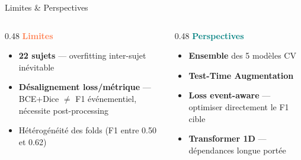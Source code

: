\documentclass[aspectratio=169, 10pt]{beamer}
\begin{document}
\begin{frame}{Limites \& Perspectives}
    \begin{columns}[T]
        \begin{column}{0.48\textwidth}
            \textbf{\textcolor{Coral}{Limites}}
            \begin{itemize}\setlength\itemsep{3pt}\small
                \item \textbf{22 sujets} --- overfitting inter-sujet inévitable
                \item \textbf{Désalignement loss/métrique} ---
                      BCE+Dice $\neq$ F1 événementiel,\\
                      nécessite post-processing
                \item Hétérogénéité des folds (F1 entre 0.50 et 0.62)
            \end{itemize}
        \end{column}
        \begin{column}{0.48\textwidth}
            \textbf{\textcolor{Teal}{Perspectives}}
            \begin{itemize}\setlength\itemsep{3pt}\small
                \item \textbf{Ensemble} des 5 modèles CV
                \item \textbf{Test-Time Augmentation}
                \item \textbf{Loss event-aware} ---
                      optimiser directement le F1 cible
                \item \textbf{Transformer 1D} ---
                      dépendances longue portée
            \end{itemize}
        \end{column}
    \end{columns}
\end{frame}
\end{document}
